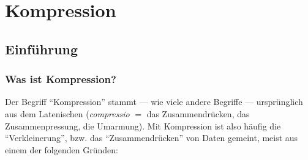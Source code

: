 \chapter{Kompression}\label{ch:Lektion}
\section{Einführung}

\subsection{Was ist Kompression?}

Der Begriff \enquote{Kompression} stammt --- wie viele andere Begriffe --- ursprünglich aus dem Latenischen (\textit{compressio} $=$ das Zusammendrücken, das Zusammenpressung, die Umarmung). Mit Kompression ist also häufig die ``Verkleinerung'', bzw. das ``Zusammendrücken'' von Daten gemeint, meist aus einem der folgenden Gründen:

